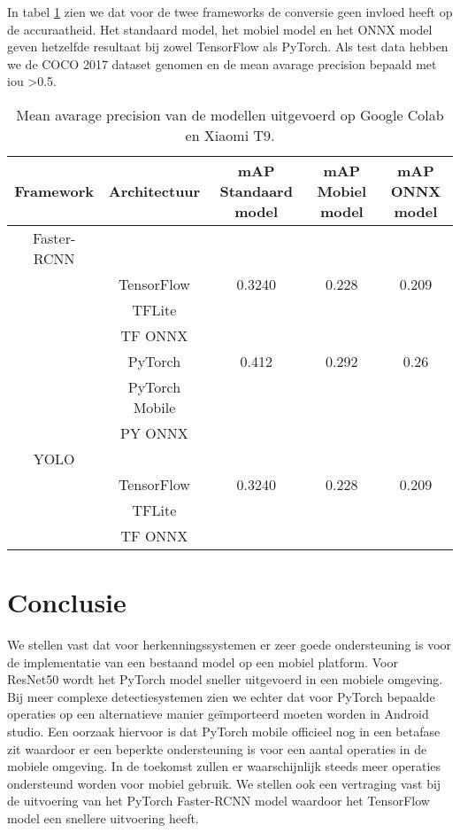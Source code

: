 In tabel \ref{tab:rcnn_acc} zien we dat voor de twee frameworks de conversie geen invloed heeft op de accuraatheid.
Het standaard model, het mobiel model en het ONNX model geven hetzelfde resultaat bij zowel TensorFlow als PyTorch.
Als test data hebben we de COCO 2017 dataset genomen en de mean avarage precision bepaald met iou \textgreater 0.5.
\begin{table}[!ht]
    \caption{Mean avarage precision van de modellen uitgevoerd op Google Colab en Xiaomi T9.}
\begin{tabular}{ccccc}
    \hline
    Framework & Architectuur & mAP Standaard model & mAP Mobiel model & mAP ONNX model\\
    \hline
    Faster-RCNN & & & & \\
     & TensorFlow & 0.3240  & 0.228 & 0.209 \\
     & TFLite & & & \\
     & TF ONNX & & & \\
     & PyTorch & 0.412 & 0.292 & 0.26 \\
     & PyTorch Mobile & & & \\
     & PY ONNX & & & \\
    YOLO & & & & \\
     & TensorFlow & 0.3240  & 0.228 & 0.209 \\
     & TFLite & & & \\
     & TF ONNX & & & \\
    \hline
\end{tabular}
\label{tab:rcnn_acc}
\end{table}

\section{Conclusie}
We stellen vast dat voor herkenningssystemen er zeer goede ondersteuning is voor de implementatie van een bestaand model op een mobiel platform.
Voor ResNet50 wordt het PyTorch model sneller uitgevoerd in een mobiele omgeving.
Bij meer complexe detectiesystemen zien we echter dat voor PyTorch bepaalde operaties op een alternatieve manier ge\"importeerd moeten worden in Android studio.
Een oorzaak hiervoor is dat PyTorch mobile officieel nog in een betafase zit waardoor er een beperkte ondersteuning is voor een aantal operaties in de mobiele omgeving.
In de toekomst zullen er waarschijnlijk steeds meer operaties ondersteund worden voor mobiel gebruik.
We stellen ook een vertraging vast bij de uitvoering van het PyTorch Faster-RCNN model waardoor het TensorFlow model een snellere uitvoering heeft.

